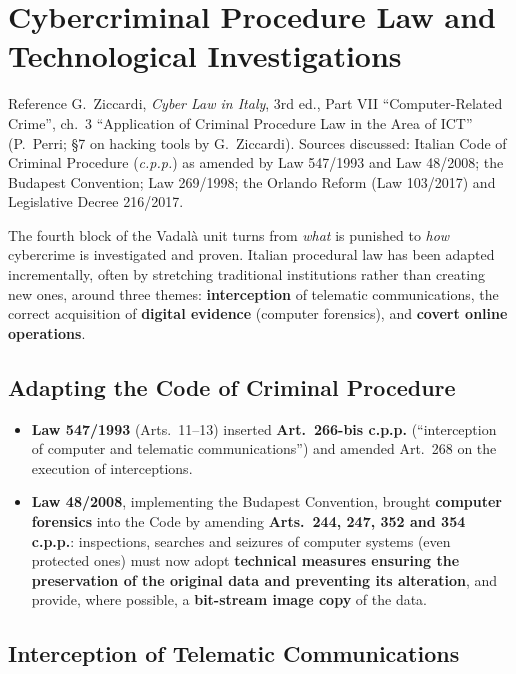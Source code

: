 \documentclass[11pt,a4paper,openany]{report}
\theoremstyle{definition}
\theoremstyle{plain}
\theoremstyle{remark}
\begin{document}
\chapter{Cybercriminal Procedure Law and Technological Investigations}
\label{chap:procedure}

\begin{sourcebox}{Reference}
G.\ Ziccardi, \textit{Cyber Law in Italy}, 3rd ed., Part VII ``Computer-Related Crime'', ch.\ 3 ``Application of Criminal Procedure Law in the Area of ICT'' (P.\ Perri; \S 7 on hacking tools by G.\ Ziccardi). Sources discussed: Italian Code of Criminal Procedure (\emph{c.p.p.}) as amended by Law 547/1993 and Law 48/2008; the Budapest Convention; Law 269/1998; the Orlando Reform (Law 103/2017) and Legislative Decree 216/2017.
\end{sourcebox}

The fourth block of the Vadal\`a unit turns from \emph{what} is punished to \emph{how} cybercrime is investigated and proven. Italian procedural law has been adapted incrementally, often by stretching traditional institutions rather than creating new ones, around three themes: \textbf{interception} of telematic communications, the correct acquisition of \textbf{digital evidence} (computer forensics), and \textbf{covert online operations}.

\section{Adapting the Code of Criminal Procedure}

\begin{itemize}
    \item \textbf{Law 547/1993} (Arts.\ 11--13) inserted \textbf{Art.\ 266-bis c.p.p.} (``interception of computer and telematic communications'') and amended Art.\ 268 on the execution of interceptions.
    \item \textbf{Law 48/2008}, implementing the Budapest Convention, brought \textbf{computer forensics} into the Code by amending \textbf{Arts.\ 244, 247, 352 and 354 c.p.p.}: inspections, searches and seizures of computer systems (even protected ones) must now adopt \textbf{technical measures ensuring the preservation of the original data and preventing its alteration}, and provide, where possible, a \textbf{bit-stream image copy} of the data.
\end{itemize}

\section{Interception of Telematic Communications}
\end{document}
